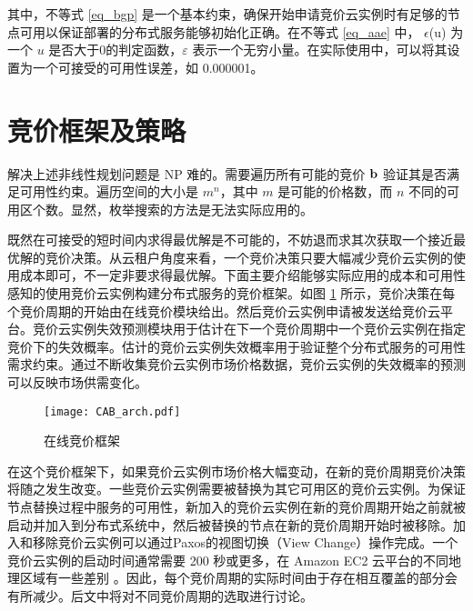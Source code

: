 其中，不等式 \eqref{eq_bgp} 是一个基本约束，确保开始申请竞价云实例时有足够的节点可用以保证部署的分布式服务能够初始化正确。在不等式 \eqref{eq_aae} 中， $\epsilon$(u) 为一个 $u$ 是否大于0的判定函数，$\varepsilon$ 表示一个无穷小量。在实际使用中，可以将其设置为一个可接受的可用性误差，如 0.000001。

\section{竞价框架及策略}
\label{jupiter-framework}
解决上述非线性规划问题是 NP 难的。需要遍历所有可能的竞价 $\bf b$ 验证其是否满足可用性约束。遍历空间的大小是 $m^n$，其中 $m$ 是可能的价格数，而 $n$ 不同的可用区个数。显然，枚举搜索的方法是无法实际应用的。

既然在可接受的短时间内求得最优解是不可能的，不妨退而求其次获取一个接近最优解的竞价决策。从云租户角度来看，一个竞价决策只要大幅减少竞价云实例的使用成本即可，不一定非要求得最优解。下面主要介绍能够实际应用的成本和可用性感知的使用竞价云实例构建分布式服务的竞价框架。如图 \ref{figure:framework} 所示，竞价决策在每个竞价周期的开始由在线竞价模块给出。然后竞价云实例申请被发送给竞价云平台。竞价云实例失效预测模块用于估计在下一个竞价周期中一个竞价云实例在指定竞价下的失效概率。估计的竞价云实例失效概率用于验证整个分布式服务的可用性需求约束。通过不断收集竞价云实例市场价格数据，竞价云实例的失效概率的预测可以反映市场供需变化。
\begin{figure}
  \centering
  \texttt{[image: CAB\_arch.pdf]}
  \caption{在线竞价框架}
  \label{figure:framework}
\end{figure}

在这个竞价框架下，如果竞价云实例市场价格大幅变动，在新的竞价周期竞价决策将随之发生改变。一些竞价云实例需要被替换为其它可用区的竞价云实例。为保证节点替换过程中服务的可用性，新加入的竞价云实例在新的竞价周期开始之前就被启动并加入到分布式系统中，然后被替换的节点在新的竞价周期开始时被移除。加入和移除竞价云实例可以通过Paxos的视图切换（View Change）操作完成。一个竞价云实例的启动时间通常需要 200 秒或更多，在 Amazon EC2 云平台的不同地理区域有一些差别 \cite{Mao:2012:PSV:2353730.2353859}。因此，每个竞价周期的实际时间由于存在相互覆盖的部分会有所减少。后文中将对不同竞价周期的选取进行讨论。

